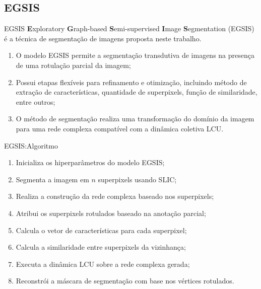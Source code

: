\documentclass{templatebeamerufc/libs/ufc_format}
\begin{document}
\subsection{EGSIS}

\begin{frame}{EGSIS}
  \textbf{E}xploratory \textbf{G}raph-based
  \textbf{S}emi-supervised \textbf{I}mage \textbf{S}egmentation (EGSIS) é
  a técnica de segmentação de imagens proposta neste trabalho.

  \begin{enumerate}
  \item O modelo EGSIS permite a segmentação transdutiva de imagens
    na presença de uma rotulação parcial da imagem;
  \item Possui etapas flexíveis para refinamento e otimização,
    incluindo método de extração de características, quantidade de
    superpixels, função de similaridade, entre outros;
  \item O método de segmentação realiza uma transformação do domínio
    da imagem para uma rede complexa compatível com a dinâmica coletiva
    LCU.\@
  \end{enumerate}

\end{frame}

\begin{frame}{EGSIS:\@ Algoritmo}
  \begin{enumerate}
  \item Inicializa os hiperparâmetros do modelo EGSIS;\@
  \item Segmenta a imagem em $n$ superpixels usando SLIC;\@
  \item Realiza a construção da rede complexa baseado nos superpixels;
  \item Atribui os superpixels rotulados baseado na anotação parcial;
  \item Calcula o vetor de características para cada superpixel;
  \item Calcula a similaridade entre superpixels da vizinhança;
  \item Executa a dinâmica LCU sobre a rede complexa gerada;
  \item Reconstrói a máscara de segmentação com base nos vértices rotulados.
  \end{enumerate}
\end{frame}

\end{document}
